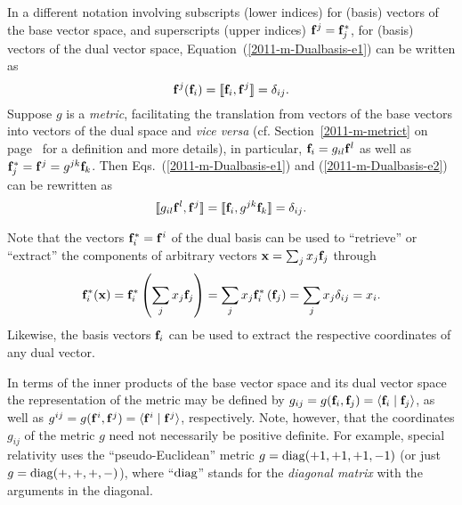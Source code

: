 In a different notation involving subscripts (lower indices) for (basis) vectors of the base vector space,
and superscripts (upper indices) ${\bf f}^j = {\bf f}_j^\ast $,
for (basis) vectors of the dual vector space,
Equation~(\ref{2011-m-Dualbasis-e1}) can be written as
\begin{equation}
{\bf f}^j ( {\bf f}_i ) = \llbracket {\bf f}_i,{\bf f}^j\rrbracket =\delta_{ij}.
\label{2011-m-Dualbasis-e2}
\end{equation}
Suppose
$g$ is a {\em metric},
facilitating the translation from vectors of the base vectors into vectors of the dual space and {\it vice versa}
(cf. Section~\ref{2011-m-metrict} on page~\pageref{2011-m-metrict} for a definition and more details),
in particular, ${\bf f}_i =  g_{il}{\bf f}^l$
as well as  ${\bf f}_j^\ast  = {\bf f}^j = g^{jk}{\bf f}_k$.
Then Eqs.~(\ref{2011-m-Dualbasis-e1}) and (\ref{2011-m-Dualbasis-e2}) can be rewritten as
\begin{equation}
\llbracket g_{il} {\bf f}^l, {\bf f}^j\rrbracket     = \llbracket {\bf f}_i, g^{jk} {\bf f}_k\rrbracket   = \delta_{ij}.
\label{2011-m-Dualbasis-e3}
\end{equation}

Note that the vectors ${\bf f}^\ast_i = {\bf f}^i$ of the dual basis can be used to ``retrieve''
or ``extract'' the components of arbitrary vectors
${\bf x} = \sum_j x_j {\bf f}_j$  through
\begin{equation}
{\bf f}^\ast_i ( {\bf x} ) =
{\bf f}^\ast_i \left( \sum_j x_j {\bf f}_j \right) =
\sum_j  x_j {\bf f}^\ast_i \left({\bf f}_j \right) =
\sum_j  x_j \delta_{ij} =
x_i.
\label{2016-m-fdlvs-recoverc}
\end{equation}
Likewise, the basis vectors ${\bf f}_i$ can be used to extract the respective coordinates of any dual vector.



In terms of the inner products of the base vector space and its dual vector space the representation
of the metric
may be defined by
$g_{ij}=g({\bf f}_i,{\bf f}_j)=\langle {\bf f}_i\mid {\bf f}_j\rangle$,
as well as
$g^{ij}=g({\bf f}^i,{\bf f}^j) =\langle {\bf f}^i\mid {\bf f}^j\rangle$, respectively.
Note, however, that the coordinates $g_{ij}$ of
the metric $g$ need not necessarily be positive definite.
For example,  special relativity uses the ``pseudo-Euclidean'' metric
 $g={\rm diag}(+1,+1,+1,-1)$ (or just $g={\rm diag}(+,+,+,-)$), where ``${\rm diag}$''
stands for the {\em diagonal matrix}
with the arguments in the diagonal.




